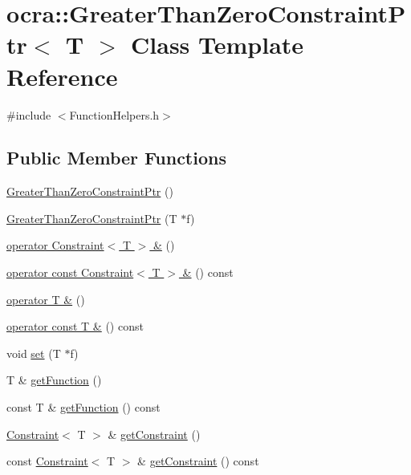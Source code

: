 \hypertarget{classocra_1_1GreaterThanZeroConstraintPtr}{}\section{ocra\+:\+:Greater\+Than\+Zero\+Constraint\+Ptr$<$ T $>$ Class Template Reference}
\label{classocra_1_1GreaterThanZeroConstraintPtr}


{\ttfamily \#include $<$Function\+Helpers.\+h$>$}

\subsection*{Public Member Functions}
\begin{DoxyCompactItemize}
\item 
\hyperlink{classocra_1_1GreaterThanZeroConstraintPtr_a37dc1b390edf7f0bbc3d3a8774edff12}{Greater\+Than\+Zero\+Constraint\+Ptr} ()
\item 
\hyperlink{classocra_1_1GreaterThanZeroConstraintPtr_ac1a017fafc95dfc3ac4c814125a5bfac}{Greater\+Than\+Zero\+Constraint\+Ptr} (T $\ast$f)
\item 
\hyperlink{classocra_1_1GreaterThanZeroConstraintPtr_a276bed22a9049cfee41cb189a1956838}{operator Constraint$<$ T $>$ \&} ()
\item 
\hyperlink{classocra_1_1GreaterThanZeroConstraintPtr_a115adf151f07b8b6fa8b54f1fb10d513}{operator const Constraint$<$ T $>$ \&} () const 
\item 
\hyperlink{classocra_1_1GreaterThanZeroConstraintPtr_aa18bca4465d3efe6ce64339609d7e7f9}{operator T \&} ()
\item 
\hyperlink{classocra_1_1GreaterThanZeroConstraintPtr_afc2ce82048d337a9c106b144dabb9576}{operator const T \&} () const 
\item 
void \hyperlink{classocra_1_1GreaterThanZeroConstraintPtr_a3c6c6625ab65691ed326a0a17b0d9e27}{set} (T $\ast$f)
\item 
T \& \hyperlink{classocra_1_1GreaterThanZeroConstraintPtr_a08864214cedd5b05f5318f29a941693d}{get\+Function} ()
\item 
const T \& \hyperlink{classocra_1_1GreaterThanZeroConstraintPtr_a20a7b2284a38d98cee3dbc73a572b3a8}{get\+Function} () const 
\item 
\hyperlink{classocra_1_1Constraint}{Constraint}$<$ T $>$ \& \hyperlink{classocra_1_1GreaterThanZeroConstraintPtr_a9ef54456b60a13c1bd518969fc7f3f8b}{get\+Constraint} ()
\item 
const \hyperlink{classocra_1_1Constraint}{Constraint}$<$ T $>$ \& \hyperlink{classocra_1_1GreaterThanZeroConstraintPtr_a1a433c979954e59992433bbc3f602a70}{get\+Constraint} () const 
\end{DoxyCompactItemize}


